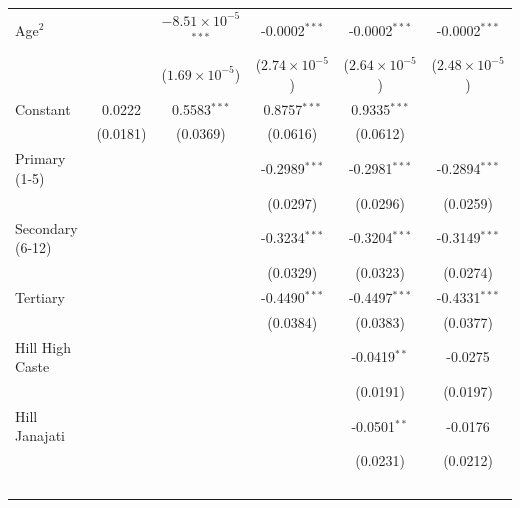 \begin{tabular}{lccccc}
   Age$^2$                           &                 & $-8.51\times 10^{-5}$$^{***}$  & -0.0002$^{***}$         & -0.0002$^{***}$         & -0.0002$^{***}$\\   
                                     &                 & ($1.69\times 10^{-5}$)         & ($2.74\times 10^{-5}$)  & ($2.64\times 10^{-5}$)  & ($2.48\times 10^{-5}$)\\    
   Constant                          & 0.0222          & 0.5583$^{***}$                 & 0.8757$^{***}$          & 0.9335$^{***}$          &   \\   
                                     & (0.0181)        & (0.0369)                       & (0.0616)                & (0.0612)                &   \\   
   Primary (1-5)                     &                 &                                & -0.2989$^{***}$         & -0.2981$^{***}$         & -0.2894$^{***}$\\   
                                     &                 &                                & (0.0297)                & (0.0296)                & (0.0259)\\   
   Secondary (6-12)                  &                 &                                & -0.3234$^{***}$         & -0.3204$^{***}$         & -0.3149$^{***}$\\   
                                     &                 &                                & (0.0329)                & (0.0323)                & (0.0274)\\   
   Tertiary                          &                 &                                & -0.4490$^{***}$         & -0.4497$^{***}$         & -0.4331$^{***}$\\   
                                     &                 &                                & (0.0384)                & (0.0383)                & (0.0377)\\   
   Hill High Caste                   &                 &                                &                         & -0.0419$^{**}$          & -0.0275\\   
                                     &                 &                                &                         & (0.0191)                & (0.0197)\\   
   Hill Janajati                     &                 &                                &                         & -0.0501$^{**}$          & -0.0176\\   
                                     &                 &                                &                         & (0.0231)                & (0.0212)\\   
$$
\end{tabular}
